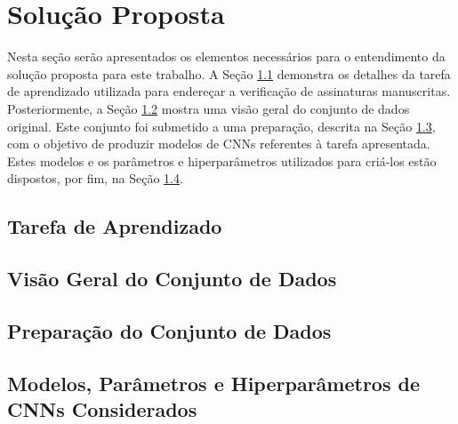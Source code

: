 
\chapter{Solução Proposta} \label{cap:sol-prop}

Nesta seção serão apresentados os elementos necessários para o entendimento da solução proposta para este trabalho. A Seção \ref{sec:tarefa} demonstra os detalhes da tarefa de aprendizado utilizada para endereçar a verificação de assinaturas manuscritas. Posteriormente, a Seção \ref{sec:visaogeral} mostra uma visão geral do conjunto de dados original. Este conjunto foi submetido a uma preparação, descrita na Seção \ref{sec:preparacao}, com o objetivo de produzir modelos de CNNs referentes à tarefa apresentada. Estes modelos e os parâmetros e hiperparâmetros utilizados para criá-los estão dispostos, por fim, na Seção \ref{sec:modelos}.

\section{Tarefa de Aprendizado}

\label{sec:tarefa}

\section{Visão Geral do Conjunto de Dados}

\label{sec:visaogeral}

\section{Preparação do Conjunto de Dados}

\label{sec:preparacao}

\section{Modelos, Parâmetros e Hiperparâmetros de CNNs Considerados}

\label{sec:modelos}
